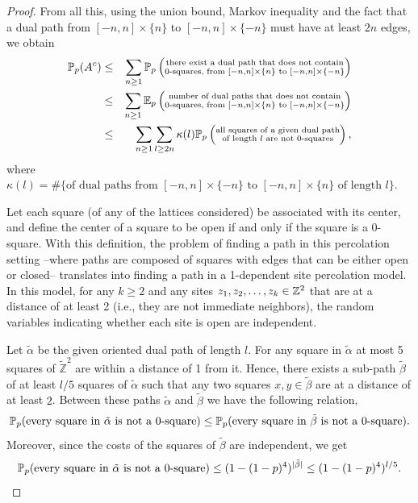 \begin{proof}
           From all this, using the union bound, Markov inequality and the fact that a dual path from $[-n, n] \times \{n\}$ to $[-n, n] \times \{-n\}$ must have at least $2n$ edges, we obtain
           \begin{eqnarray} \notag
                \mathbb{P}_p(A^c) & \leq & \sum_{n \geq 1} \mathbb{P}_p\left(\substack{\text{there exist a dual path that does not contain} \\ \text{0-squares, from } [-n, n] \times \{n\} \text{ to } [-n, n] \times \{-n\}}\right) \\ \notag
                            & \leq & \sum_{n \geq 1} \mathbb{E}_p\left(\substack{\text{number of dual paths that does not contain} \\ \text{0-squares, from } [-n, n] \times \{n\} \text{ to } [-n, n] \times \{-n\}}\right) \\ \notag
                            & \leq & \sum_{n \geq 1} \sum_{l \geq 2n} \kappa(l) \mathbb{P}_p\left(\substack{\text{all squares of a given dual path} \\ \text{of length $l$ are not  0-squares}}\right),
           \end{eqnarray}   
           where $\kappa(l) = \#\{\text{of dual paths from } [-n, n] \times \{-n\} \text{ to } [-n, n] \times \{n\} \text{ of length } l\}$.

           Let each square (of any of the lattices considered) be associated with its center, and define the center of a square to be open if and only if the square is a 0-square. With this definition, the problem of finding a path in this percolation setting --where paths are composed of squares with edges that can be either open or closed-- translates into finding a path in a 1-dependent site percolation model. In this model, for any $k \geq 2$ and any sites $z_1, z_2, \ldots, z_k \in \mathbb{Z}^2$ that are at a distance of at least 2 (i.e., they are not immediate neighbors), the random variables indicating whether each site is open are independent.

           Let $\tilde{\alpha}$ be the given oriented dual path of length $l$. For any square in $\tilde{\alpha}$ at most 5 squares of $\tilde{\mathbb{Z}}^2$ are within a distance of 1 from it. Hence, there exists a sub-path $\tilde{\beta}$ of at least $l/5$ squares of $\tilde{\alpha}$ such that any two squares $x, y \in \tilde{\beta}$ are at a distance of at least $2$. Between these paths $\tilde{\alpha}$ and $\tilde{\beta}$ we have the following relation, 
           $$
                \mathbb{P}_p(\text{every square in } \tilde{\alpha} \text{ is not a 0-square}) \leq \mathbb{P}_p(\text{every square in } \tilde{\beta} \text{ is not a 0-square}).
           $$ 
           Moreover, since the costs of the squares of $\tilde{\beta}$ are independent, we get
           \[
                \mathbb{P}_p(\text{every square in } \tilde{\alpha} \text{ is not a 0-square}) \leq (1 - (1-p)^4)^{|\tilde{\beta}|} \leq (1 - (1-p)^4)^{l/5}. 
           \]


\end{proof}
